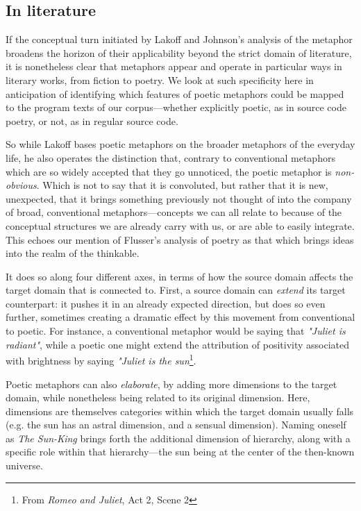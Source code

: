 \documentclass{article}
\begin{document}
\subsection{In literature}

If the conceptual turn initiated by Lakoff and Johnson's analysis of the metaphor broadens the horizon of their applicability beyond the strict domain of literature, it is nonetheless clear that metaphors appear and operate in particular ways in literary works, from fiction to poetry. We look at such specificity here in anticipation of identifying which features of poetic metaphors could be mapped to the program texts of our corpus—whether explicitly poetic, as in source code poetry, or not, as in regular source code.

So while Lakoff bases poetic metaphors on the broader metaphors of the everyday life, he also operates the distinction that, contrary to conventional metaphors which are so widely accepted that they go unnoticed, the poetic metaphor is \emph{non-obvious}. Which is not to say that it is convoluted, but rather that it is new, unexpected, that it brings something previously not thought of into the company of broad, conventional metaphors—concepts we can all relate to because of the conceptual structures we are already carry with us, or are able to easily integrate. This echoes our mention of Flusser's analysis of poetry as that which brings ideas into the realm of the thinkable.

It does so along four different axes, in terms of how the source domain affects the target domain that is connected to. First, a source domain can \emph{extend} its target counterpart: it pushes it in an already expected direction, but does so even further, sometimes creating a dramatic effect by this movement from conventional to poetic. For instance, a conventional metaphor would be saying that \emph{"Juliet is radiant"}, while a poetic one might extend the attribution of positivity associated with brightness by saying \emph{"Juliet is the sun}\footnote{From \emph{Romeo and Juliet}, Act 2, Scene 2}.

Poetic metaphors can also \emph{elaborate}, by adding more dimensions to the target domain, while nonetheless being related to its original dimension. Here, dimensions are themselves categories within which the target domain usually falls (e.g. the sun has an astral dimension, and a sensual dimension). Naming oneself as \emph{The Sun-King} brings forth the additional dimension of hierarchy, along with a specific role within that hierarchy—the sun being at the center of the then-known universe.
\end{document}
